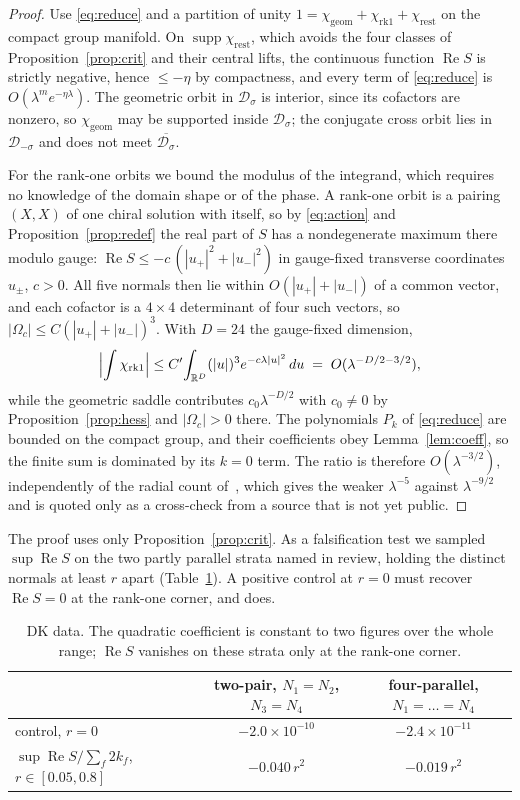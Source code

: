 \documentclass[11pt]{article}
\numberwithin{equation}{section}
\theoremstyle{definition}
\theoremstyle{remark}
\newcommand{\Dom}{\mathcal D}
\renewcommand{\Re}{\operatorname{Re}}
\begin{document}
\begin{proof}
Use \eqref{eq:reduce} and a partition of unity
$1=\chi_{\mathrm{geom}}+\chi_{\mathrm{rk1}}+\chi_{\mathrm{rest}}$ on the compact
group manifold. On $\operatorname{supp}\chi_{\mathrm{rest}}$, which avoids the
four classes of Proposition~\ref{prop:crit} and their central lifts, the
continuous function $\Re S$ is
strictly negative, hence $\le-\eta$ by compactness, and every term of
\eqref{eq:reduce} is $O(\lambda^me^{-\eta\lambda})$. The geometric orbit in
$\Dom_\sigma$ is interior, since its cofactors are nonzero, so
$\chi_{\mathrm{geom}}$ may be supported inside $\Dom_\sigma$; the conjugate cross
orbit lies in $\Dom_{-\sigma}$ and does not meet $\overline{\Dom_\sigma}$.

For the rank-one orbits we bound the modulus of the integrand, which requires no
knowledge of the domain shape or of the phase. A rank-one orbit is a pairing
$(X,X)$ of one chiral solution with itself, so by \eqref{eq:action} and
Proposition~\ref{prop:redef} the real part of $S$ has a nondegenerate maximum
there modulo gauge:
$\Re S\le-c\,(|u_+|^2+|u_-|^2)$ in gauge-fixed transverse coordinates $u_\pm$,
$c>0$. All five normals then lie within $O(|u_+|+|u_-|)$ of a common vector, and
each cofactor is a $4\times4$ determinant of four such vectors, so
$|\Omega_c|\le C(|u_+|+|u_-|)^3$. With $D=24$ the gauge-fixed dimension,
\[
\Bigl|\int\chi_{\mathrm{rk1}}\Bigr|
\le C'\!\int_{\mathbb R^{D}}(|u|)^3e^{-c\lambda|u|^2}\,du
\;=\;O(\lambda^{-D/2-3/2}),
\]
while the geometric saddle contributes $c_0\lambda^{-D/2}$ with $c_0\neq0$ by
Proposition~\ref{prop:hess} and $|\Omega_c|>0$ there. The polynomials $P_k$ of
\eqref{eq:reduce} are bounded on the compact group, and their coefficients obey
Lemma~\ref{lem:coeff}, so the finite sum is dominated by its $k=0$ term. The
ratio is therefore $O(\lambda^{-3/2})$, independently of the radial count
of~\cite{W2vertex}, which gives the weaker $\lambda^{-5}$ against
$\lambda^{-9/2}$ and is quoted only as a cross-check from a source that is not
yet public.
\end{proof}

The proof uses only Proposition~\ref{prop:crit}. As a falsification test we
sampled $\sup\Re S$ on the two partly parallel strata named in review, holding
the distinct normals at least $r$ apart (Table~\ref{tab:strata}). A positive
control at $r=0$ must recover $\Re S=0$ at the rank-one corner, and does.

\begin{table}[h]
\centering
\begin{tabular}{lcc}
\toprule
& two-pair, $N_1{=}N_2$, $N_3{=}N_4$ & four-parallel, $N_1{=}\dots{=}N_4$\\
\midrule
control, $r=0$ & $-2.0\times10^{-10}$ & $-2.4\times10^{-11}$\\
$\sup\Re S/\sum_f2k_f$, $r\in[0.05,0.8]$ & $-0.040\,r^2$ & $-0.019\,r^2$\\
\bottomrule
\end{tabular}
\caption{DK data. The quadratic coefficient is constant to two figures over the
whole range; $\Re S$ vanishes on these strata only at the rank-one corner.}
\label{tab:strata}
\end{table}
\end{document}
